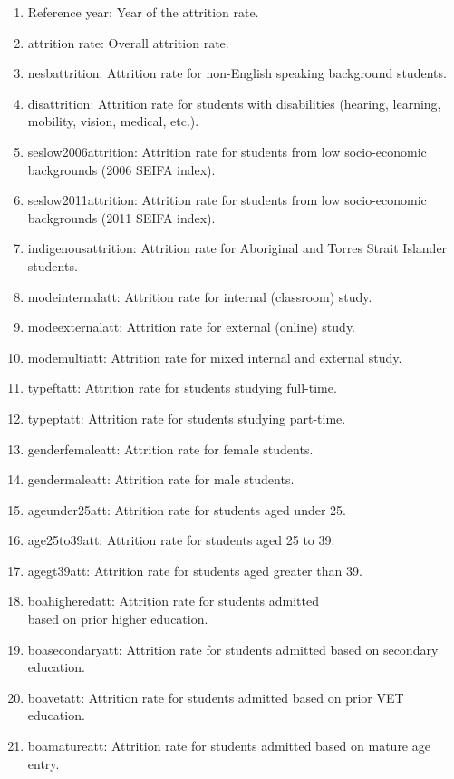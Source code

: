 \documentclass[conference]{IEEEtran}
\begin{document}
\begin{enumerate} [leftmargin=2em, itemsep=0.01em, topsep=0.01em]
    \item Reference year: Year of the attrition rate.
    \item attrition rate: Overall attrition rate.
    \item nesbattrition: Attrition rate for non-English speaking background students.
    \item disattrition: Attrition rate for students with disabilities (hearing, learning, mobility, vision, medical, etc.).
    \item seslow2006attrition: Attrition rate for students from low socio-economic backgrounds (2006 SEIFA index).
    \item seslow2011attrition: Attrition rate for students from low socio-economic backgrounds (2011 SEIFA index).
    \item indigenousattrition: Attrition rate for Aboriginal and Torres Strait Islander students.
    \item modeinternalatt: Attrition rate for internal (classroom) study.
    \item modeexternalatt: Attrition rate for external (online) study.
    \item modemultiatt: Attrition rate for mixed internal and external study.
    \item typeftatt: Attrition rate for students studying full-time.
    \item typeptatt: Attrition rate for students studying part-time.
    \item genderfemaleatt: Attrition rate for female students.
    \item gendermaleatt: Attrition rate for male students.
    \item ageunder25att: Attrition rate for students aged under 25.
    \item age25to39att: Attrition rate for students aged 25 to 39.
    \item agegt39att: Attrition rate for students aged greater than 39.
    \item boahigheredatt: Attrition rate for students admitted \\ based on prior higher education.
    \item boasecondaryatt: Attrition rate for students admitted based on secondary education.
    \item boavetatt: Attrition rate for students admitted based on prior VET education.
    \item boamatureatt: Attrition rate for students admitted based on mature age entry.

\end{enumerate}
\end{document}
